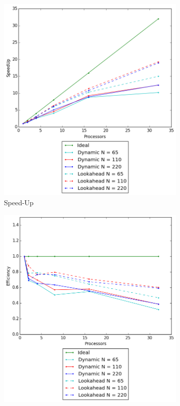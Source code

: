 \documentclass[letterpaper,twoside,11pt]{article}
\begin{document}
\begin{multicols}{2}
\begin{figure}
  \centering
  \begin{subfigure}{.5\textwidth}
    \centering
    \includegraphics[width=.99\textwidth]{../3 Analysis/SpeedUp.png}
    \caption{Speed-Up}
    \label{fig:SpeedUp}
  \end{subfigure}%
  \begin{subfigure}{.5\textwidth}
    \centering
    \includegraphics[width=.99\textwidth]{../3 Analysis/Efficiency.png}

\end{subfigure}
\end{figure}
\end{multicols}
\end{document}
